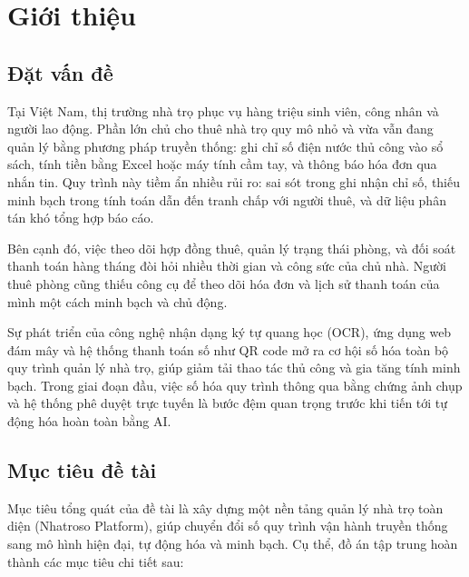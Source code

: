 \chapter{Giới thiệu}\label{chapter_intro}

\section{Đặt vấn đề}

Tại Việt Nam, thị trường nhà trọ phục vụ hàng triệu sinh viên, công nhân và người lao động. Phần lớn chủ cho thuê nhà trọ quy mô nhỏ và vừa vẫn đang quản lý bằng phương pháp truyền thống: ghi chỉ số điện nước thủ công vào sổ sách, tính tiền bằng Excel hoặc máy tính cầm tay, và thông báo hóa đơn qua nhắn tin. Quy trình này tiềm ẩn nhiều rủi ro: sai sót trong ghi nhận chỉ số, thiếu minh bạch trong tính toán dẫn đến tranh chấp với người thuê, và dữ liệu phân tán khó tổng hợp báo cáo.

Bên cạnh đó, việc theo dõi hợp đồng thuê, quản lý trạng thái phòng, và đối soát thanh toán hàng tháng đòi hỏi nhiều thời gian và công sức của chủ nhà. Người thuê phòng cũng thiếu công cụ để theo dõi hóa đơn và lịch sử thanh toán của mình một cách minh bạch và chủ động.

Sự phát triển của công nghệ nhận dạng ký tự quang học (OCR), ứng dụng web đám mây và hệ thống thanh toán số như QR code mở ra cơ hội số hóa toàn bộ quy trình quản lý nhà trọ, giúp giảm tải thao tác thủ công và gia tăng tính minh bạch. Trong giai đoạn đầu, việc số hóa quy trình thông qua bằng chứng ảnh chụp và hệ thống phê duyệt trực tuyến là bước đệm quan trọng trước khi tiến tới tự động hóa hoàn toàn bằng AI.

\section{Mục tiêu đề tài}

Mục tiêu tổng quát của đề tài là xây dựng một nền tảng quản lý nhà trọ toàn diện (Nhatroso Platform), giúp chuyển đổi số quy trình vận hành truyền thống sang mô hình hiện đại, tự động hóa và minh bạch. Cụ thể, đồ án tập trung hoàn thành các mục tiêu chi tiết sau:

